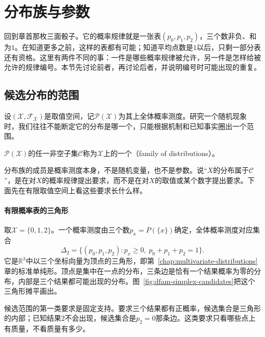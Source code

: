 \section{分布族与参数}
\label{sec:dfam-families}

回到章首那枚三面骰子。它的概率规律就是一张表$(p_0,p_1,p_2)$，三个数非负、和为$1$。在知道更多之前，这样的表都有可能；知道平均点数是$1$以后，只剩一部分表还有资格。这里有两件不同的事：一件是哪些概率规律被允许，另一件是怎样给被允许的规律编号。本节先讨论前者，再讨论后者，并说明编号时可能出现的重复。

\subsection{候选分布的范围}
\label{sec:dfam-candidates}

设$(\mathcal{X},\mathcal{F}_{\mathcal{X}})$是取值空间，记$\mathcal{P}(\mathcal{X})$为其上全体概率测度。研究一个随机现象时，我们往往不能断定它的分布是哪一个，只能根据机制和已知事实圈出一个范围。

\begin{definition}[分布族]
\label{def:dfam-family}
$\mathcal{P}(\mathcal{X})$的任一非空子集$\mathcal{C}$称为$\mathcal{X}$上的一个（family of distributions）。
\end{definition}

分布族的成员是概率测度本身，不是随机变量，也不是参数。说“$X$的分布属于$\mathcal{C}$”，是在对$X$的概率规律提出要求，而不是在对$X$的取值或某个数字提出要求。下面先在有限取值空间上看这些要求长什么样。

\paragraph{有限概率表的三角形}
取$\mathcal{X}=\{0,1,2\}$。一个概率测度由三个数$p_x=P(\{x\})$确定，全体概率测度对应集合
\begin{equation}
  \Delta_2=\{(p_0,p_1,p_2):p_x\geq0,\ p_0+p_1+p_2=1\}.
  \label{eq:dfam-simplex}
\end{equation}
它是$\mathbb{R}^{3}$中以三个坐标向量为顶点的三角形，即第~\ref{chap:multivariate-distributions}章的标准单纯形。顶点是集中在一点的分布，三条边是恰有一个结果概率为零的分布，内部是三个结果都可能出现的分布。图~\ref{fig:dfam-simplex-candidates}把这个三角形摊平画出。

候选范围的第一类要求是固定支持。要求三个结果都有正概率，候选集合是三角形的内部；已知结果$2$不会出现，候选集合是$p_2=0$那条边。这类要求只看哪些点上有质量，不看质量有多少。

